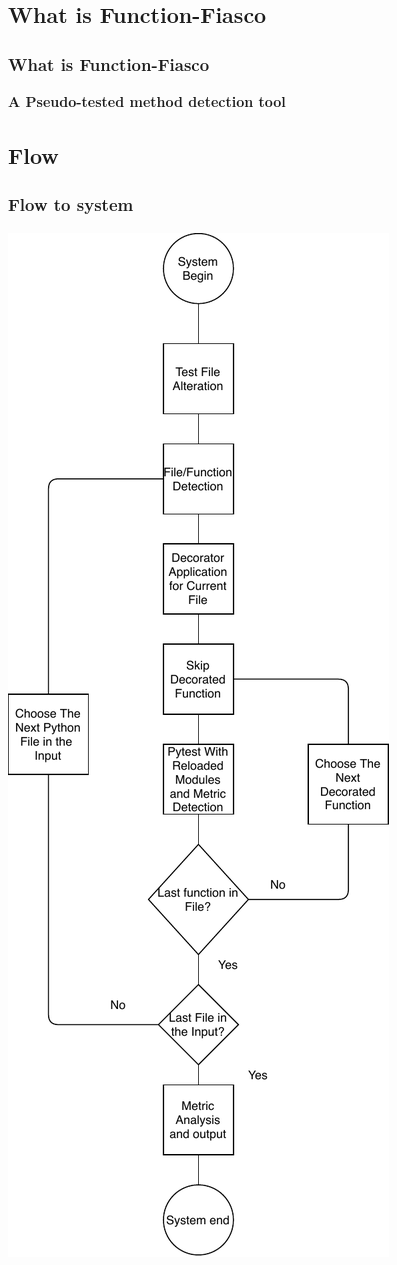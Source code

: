 \subsection{What is Function-Fiasco}
\begin{frame}
  \frametitle{What is Function-Fiasco}
    \begin{center}
      \huge{\textbf{A Pseudo-tested method detection tool}}
    \end{center}
\end{frame}

\subsection{Flow}
\begin{frame}
  \frametitle{Flow to system}
    \begin{center}
      \includegraphics[scale = .25]{images/flow1}
    \end{center}
\end{frame}
